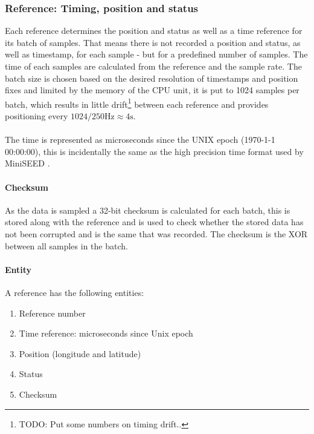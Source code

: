 \documentclass[a4paper]{article}
\begin{document}
\begin{multicols}{2}
    \subsubsection{Reference: Timing, position and status}
    Each reference determines the position and status as well as a
    time reference for its batch of samples. That means there is not
    recorded a position and status, as well as timestamp, for each
    sample - but for a predefined number of samples. The
    time of each samples are calculated from the reference and the
    sample rate. The batch size is chosen based on the desired resolution of
    timestamps and position fixes and limited by the memory of the CPU
    unit, it is put to 1024 samples per batch, which
    results in little drift\footnote{TODO: Put some numbers on timing drift..} between each reference and provides
    positioning every $1024 / 250 \text{Hz} \approx 4 \text{s}$.

    \paragraph{} The time is represented as microseconds since the UNIX
    epoch (1970-1-1 00:00:00), this is incidentally the same as the high
    precision time format used by MiniSEED \cite{libmseed_man}.

    \paragraph{Checksum}
    As the data is sampled a 32-bit checksum is calculated for each
    batch, this is stored along with the reference and is used to check
    whether the stored data has not been corrupted and is the same that
    was recorded. The checksum is the XOR between all samples in the
    batch.

    \paragraph{Entity}
    A reference has the following entities:
    \begin{enumerate}
      \item Reference number
      \item Time reference: microseconds since Unix epoch
      \item Position (longitude and latitude)
      \item Status
      \item Checksum
    \end{enumerate}


\end{multicols}
\end{document}
